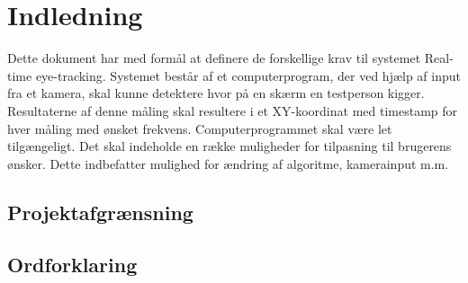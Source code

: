 \documentclass[kravspec.tex]{subfiles}
\begin{document}
	
\section{Indledning}
Dette dokument har med formål at definere de forskellige krav til systemet Real-time eye-tracking. 
Systemet består af et computerprogram, der ved hjælp af input fra et kamera, skal kunne detektere hvor på en skærm en testperson kigger. Resultaterne af denne måling skal resultere i et XY-koordinat med timestamp for hver måling med ønsket frekvens.
Computerprogrammet skal være let tilgængeligt. Det skal indeholde en række muligheder for tilpasning til brugerens ønsker. Dette indbefatter mulighed for ændring af algoritme, kamerainput m.m. 


\subsection{Projektafgrænsning}


\subsection{Ordforklaring}
\end{document}
